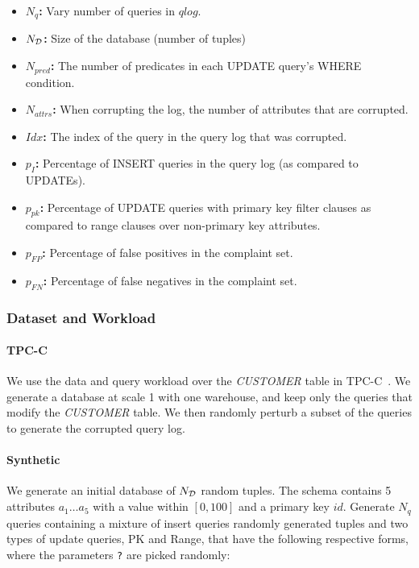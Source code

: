 \begin{itemize}
\item {\bf $N_q$:} Vary number of queries in $qlog$.
\item {\bf $N_{\cal D}$: } Size of the database (number of tuples)
\item {\bf $N_{pred}$:} The number of predicates in each UPDATE query's WHERE condition.
\item {\bf $N_{attrs}$: } When corrupting the log, the number of attributes that are corrupted.
\item {\bf $Idx$: } The index of the query in the query log that was corrupted.
\item {\bf $p_{I}$: } Percentage of INSERT queries in the query log (as compared to UPDATEs).
\item {\bf $p_{pk}$: } Percentage of UPDATE queries with primary key filter clauses as compared to range clauses over non-primary key attributes.
\item {\bf $p_{FP}$: } Percentage of false positives in the complaint set.
\item {\bf $p_{FN}$: } Percentage of false negatives in the complaint set.
\end{itemize}

\subsubsection{Dataset and Workload}


\paragraph{TPC-C} We use the data and query workload over the {\it
CUSTOMER} table in TPC-C~\cite{}.  We generate a database at scale
1 with one warehouse, and keep only the queries that modify the
{\it CUSTOMER} table.  We then randomly perturb a subset of the
queries to generate the corrupted query log.

\paragraph{Synthetic} 
We generate an initial database of $N_{\cal D}$ random tuples.  
The schema contains 5 attributes $a_1\ldots a_5$ with a value
within $[0, 100]$ and a primary key $id$. 
Generate $N_q$ queries containing a mixture of insert queries  randomly generated tuples and two types of update
queries, PK and Range, that have the following respective forms, 
where the parameters \verb|?| are picked randomly:

